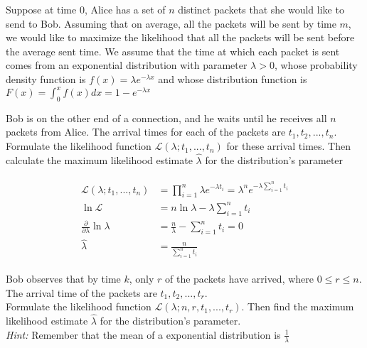 
Suppose at time $0$, Alice has a set of $n$ distinct packets that she would like to send to Bob. Assuming that on average, all the packets will be sent by time $m$, we would like to maximize the likelihood that all the packets will be sent before the average sent time. We assume that the time at which each packet is sent comes from an exponential distribution with parameter $\lambda > 0$, whose probability density function is $f(x) = \lambda e^{-\lambda x}$ and whose distribution function is $F(x) = \int_{0}^{x} f(x) dx = 1 - e^{-\lambda x}$

\begin{Parts}
\Part
Bob is on the other end of a connection, and he waits until he receives all $n$ packets from Alice. The arrival times for each of the packets are $t_1, t_2, ..., t_n$. Formulate the likelihood function $\mathcal{L}(\lambda; t_1, ..., t_n)$ for these arrival times. Then calculate the maximum likelihood estimate $\hat{\lambda}$ for the distribution's parameter

\begin{solution}
    \begin{align}
    \begin{aligned}
        \mathcal{L}(\lambda; t_1,...,t_n) &= \prod_{i=1}^n \lambda e^{-\lambda t_i} = \lambda^n e^{-\lambda \sum^{n}_{i=1} t_i}\\
        \ln \mathcal{L} &= n \ln \lambda - \lambda \sum^n_{i = 1} t_i\\
        \frac{\partial}{\partial \lambda}\ln \mathcal{\lambda} &= \frac{n}{\lambda} - \sum^n_{i=1} t_i = 0\\
        \hat{\lambda} &= \frac{n}{\sum^n_{i=1} t_i}
    \end{aligned}
    \end{align}
\end{solution}

\Part
Bob observes that by time $k$, only $r$ of the packets have arrived, where $0 \leq r \leq n$. The arrival time of the packets are $t_1, t_2, ..., t_r$.\\

Formulate the likelihood function $\mathcal{L}(\lambda; n, r, t_1,..., t_r)$. Then find the maximum likelihood estimate $\hat{\lambda}$ for the distribution's parameter.\\

\textit{Hint:} Remember that the mean of a exponential distribution is $\frac{1}{\lambda}$


\end{Parts}
